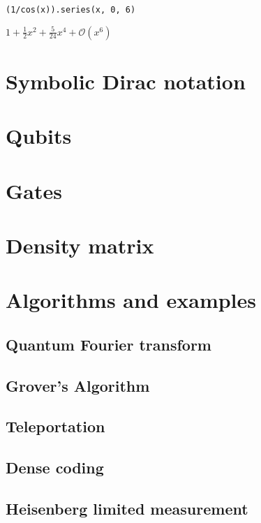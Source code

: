 \documentclass[aps,pra,groupedaddress]{revtex4-1}
\begin{document}
\begin{verbatim}
(1/cos(x)).series(x, 0, 6)
\end{verbatim}

$ 1 + \frac{1}{2} x^{2} + \frac{5}{24} x^{4} + \mathcal{O}\left(x^{6}\right) $

\section{Symbolic Dirac notation}

\section{Qubits}

\section{Gates}

\section{Density matrix}

\section{Algorithms and examples}

\subsection{Quantum Fourier transform}

\subsection{Grover's Algorithm}

\subsection{Teleportation}

\subsection{Dense coding}

\subsection{Heisenberg limited measurement}
\end{document}
